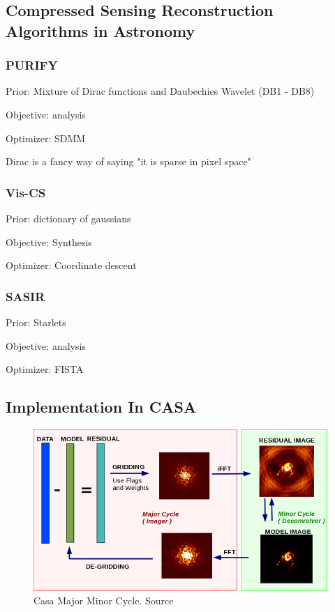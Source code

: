 
\subsection{Compressed Sensing Reconstruction Algorithms in Astronomy}


\subsubsection{PURIFY}
Prior: Mixture of Dirac functions and Daubechies Wavelet (DB1 - DB8)

Objective: analysis

Optimizer: SDMM

Dirac is a fancy way of saying "it is sparse in pixel space"


\subsubsection{Vis-CS}
Prior: dictionary of gaussians

Objective: Synthesis

Optimizer: Coordinate descent


\subsubsection{SASIR}
Prior: Starlets

Objective: analysis


Optimizer: FISTA

\pagebreak
\subsection{Implementation In CASA}

\begin{figure}
	\centering
	\vspace{-15pt}
	\includegraphics[width=0.9\linewidth]{./chapters/04.cs/img/casa_major_minor.png}
	\caption{Casa Major Minor Cycle. Source \cite{casa2018major}}
	\label{cs:major}
	\vspace{-10pt}
\end{figure}

